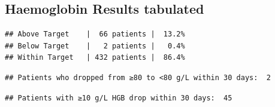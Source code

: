 \documentclass[
]{article}
\begin{document}
\subsection{Haemoglobin Results
tabulated}\label{haemoglobin-results-tabulated}

\begin{verbatim}
## Above Target    |  66 patients |  13.2%
## Below Target    |   2 patients |   0.4%
## Within Target   | 432 patients |  86.4%
\end{verbatim}

\begin{verbatim}
## Patients who dropped from ≥80 to <80 g/L within 30 days:  2
\end{verbatim}

\begin{verbatim}
## Patients with ≥10 g/L HGB drop within 30 days:  45
\end{verbatim}
\end{document}
